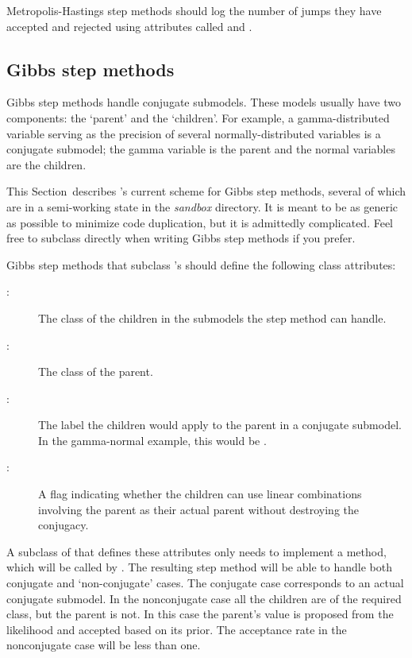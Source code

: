 \documentclass[]{jss}
\begin{document}
Metropolis-Hastings step methods should log the number of jumps they have accepted and rejected using attributes called  and .


\subsection{Gibbs step methods} \label{user-gibbs}


Gibbs step methods handle conjugate submodels. These models usually have two components: the `parent' and the `children'. For example, a gamma-distributed variable serving as the precision of several normally-distributed variables is a conjugate submodel; the gamma variable is the parent and the normal variables are the children.

This Section~describes 's current scheme for Gibbs step methods, several of which are in a semi-working state in the \emph{sandbox} directory. It is meant to be as generic as possible to minimize code duplication, but it is admittedly complicated. Feel free to subclass  directly when writing Gibbs step methods if you prefer.

Gibbs step methods that subclass 's  should define the following class attributes:
\begin{description}
   \item[:] The class of the children in the submodels the step method can handle.
   \item[:] The class of the parent.
   \item[:] The label the children would apply to the parent in a conjugate submodel. In the gamma-normal example, this would be .
   \item[:] A flag indicating whether the children can use linear combinations involving the parent as their actual parent without destroying the conjugacy.
\end{description}

A subclass of  that defines these attributes only needs to implement a  method, which will be called by . The resulting step method will be able to handle both conjugate and `non-conjugate' cases. The conjugate case corresponds to an actual conjugate submodel. In the nonconjugate case all the children are of the required class, but the parent is not. In this case the parent's value is proposed from the likelihood and accepted based on its prior. The acceptance rate in the nonconjugate case will be less than one.
\end{document}
